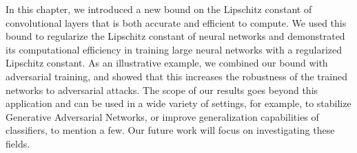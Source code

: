 In this chapter, we introduced a new bound on the Lipschitz constant of convolutional layers that is both accurate and efficient to compute.
We used this bound to regularize the Lipschitz constant of neural networks and demonstrated its computational efficiency in training large neural networks with a regularized Lipschitz constant.
As an illustrative example, we   combined our bound with adversarial training, and showed that this increases the robustness of the trained networks to  adversarial attacks.
The scope of our results goes beyond this application and can be used  in a wide variety of settings, for example, to stabilize Generative Adversarial Networks, or improve generalization capabilities of classifiers, to mention a few.
Our future work will focus on investigating these fields. 





